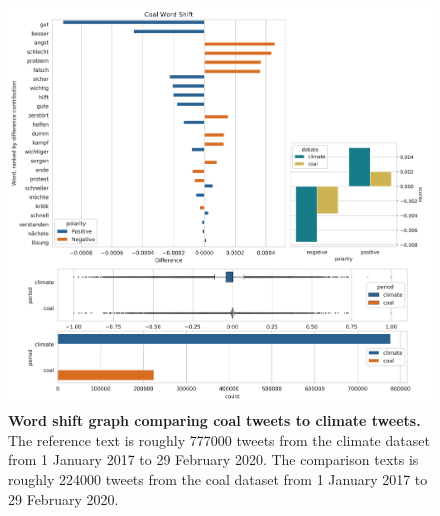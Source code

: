 \documentclass[12pt,onecolumn,twoside]{layout}
\begin{document}
\begin{figure}
	\begin{center}
		\includegraphics[width=\linewidth]{figures/wordshift_coal_climate_composite}
	\end{center}
	\caption{\textbf{Word shift graph comparing coal tweets to climate tweets.} The reference text is roughly 777000 tweets from the climate dataset from 1 January 2017 to 29 February 2020. The comparison texts is roughly 224000 tweets from the coal dataset from 1 January 2017 to 29 February 2020.}
	\label{fig:wordshift_coal_climate}
\end{figure}
\end{document}
